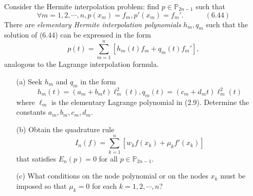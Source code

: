 \documentclass[lang=cn,a4paper,newtx,bibend=bibtex]{elegantpaper}
\begin{document}
\begin{prob}
  Consider the Hermite interpolation problem: find $p\in \mathbb{P}_{2n - 1}$ such that
  \[\forall m = 1, 2, \cdots, n, p(x_m) = f_m, p'(x_m) = f_m'.\quad\quad\quad(6.44)\]
  There are \textit{elementary Hermite interpolation polynomials} $h_m, q_m$ such that
  the solution of (6.44) can be expressed in the form 
  \[p(t) = \sum_{m = 1}^n [h_m(t)f_m + q_m(t)f_m'],\]
  analogous to the Lagrange interpolation formula.
  \begin{enumerate}
    \item[(a)] Seek $h_m$ and $q_m$ in the form
    \[h_m(t) = (a_m + b_m t)\ell^2_m(t), q_m(t) = (c_m + d_m t) \ell_m^2(t)\]
    where $\ell_m$ is the elementary Lagrange polynomial in (2.9).
    Determine the constants $a_m, b_m, c_m, d_m$.
    \item[(b)] Obtain the quadrature rule
    \[I_n(f) = \sum_{k = 1}^{n} [w_kf(x_k) + \mu_k f'(x_k)]\]
    that satisfies $E_n(p) = 0$ for all $p \in \mathbb{P}_{2n - 1}$.
    \item[(c)] What conditions on the node polynomial or on the nodes $x_k$ must be
    imposed so that $\mu_k = 0$ for each $k = 1, 2, \cdots, n$?  
  \end{enumerate}
\end{prob}
\end{document}
